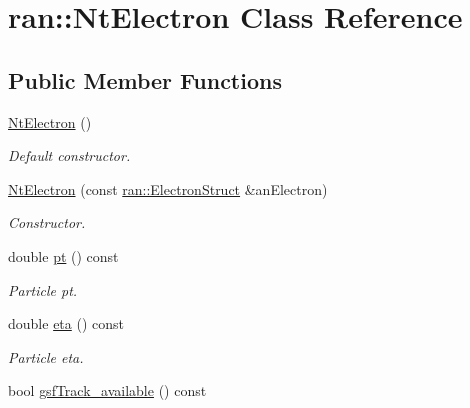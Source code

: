 \hypertarget{classran_1_1NtElectron}{\section{ran\-:\-:Nt\-Electron Class Reference}
\label{classran_1_1NtElectron}
}
\subsection*{Public Member Functions}
\begin{DoxyCompactItemize}
\item 
\hypertarget{classran_1_1NtElectron_a9894bfecb290959cf63dc7b7b5b937db}{\hyperlink{classran_1_1NtElectron_a9894bfecb290959cf63dc7b7b5b937db}{Nt\-Electron} ()}\label{classran_1_1NtElectron_a9894bfecb290959cf63dc7b7b5b937db}

\begin{DoxyCompactList}\small\item\em Default constructor. \end{DoxyCompactList}\item 
\hypertarget{classran_1_1NtElectron_a10786baddcc09f56a22ac11daa274416}{\hyperlink{classran_1_1NtElectron_a10786baddcc09f56a22ac11daa274416}{Nt\-Electron} (const \hyperlink{classran_1_1ElectronStruct}{ran\-::\-Electron\-Struct} \&an\-Electron)}\label{classran_1_1NtElectron_a10786baddcc09f56a22ac11daa274416}

\begin{DoxyCompactList}\small\item\em Constructor. \end{DoxyCompactList}\item 
\hypertarget{classran_1_1NtElectron_a9707f61ec74a898532aa8ec84c31d075}{double \hyperlink{classran_1_1NtElectron_a9707f61ec74a898532aa8ec84c31d075}{pt} () const }\label{classran_1_1NtElectron_a9707f61ec74a898532aa8ec84c31d075}

\begin{DoxyCompactList}\small\item\em Particle pt. \end{DoxyCompactList}\item 
\hypertarget{classran_1_1NtElectron_aa270b767101d46ee92711dce9d1ba47e}{double \hyperlink{classran_1_1NtElectron_aa270b767101d46ee92711dce9d1ba47e}{eta} () const }\label{classran_1_1NtElectron_aa270b767101d46ee92711dce9d1ba47e}

\begin{DoxyCompactList}\small\item\em Particle eta. \end{DoxyCompactList}\item 
\hypertarget{classran_1_1NtElectron_a0337d765a1985f4a87a26061e0cf898e}{bool \hyperlink{classran_1_1NtElectron_a0337d765a1985f4a87a26061e0cf898e}{gsf\-Track\-\_\-available} () const }\label{classran_1_1NtElectron_a0337d765a1985f4a87a26061e0cf898e}


\end{DoxyCompactItemize}
